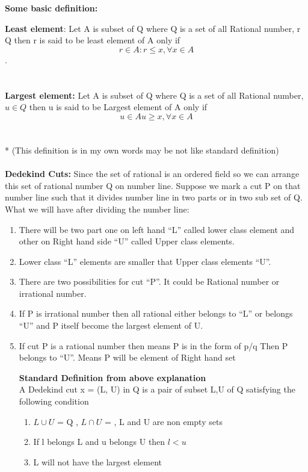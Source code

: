 \documentclass[15]{article}
\begin{document}
\textbf{Some basic definition:}

\textbf{Least element}:  Let A is subset of Q where Q is a set of all Rational number, r  Q then r is said to be least element of A only if
$$r {\in} A:r {\leq x} ,{\forall} x {\in} A$$. \\   
\\
\\
\textbf{Largest element:}  Let A is subset of Q where Q is a set of all Rational number, $ u {\in} Q $ then u is said to be Largest element of A only if
$$u {\in} A
u {\geq} x, \forall x \in A $$
\\
\\*
(This definition is in my own words may be not like standard definition)\\
\\
\textbf{Dedekind Cuts:}  Since the set of rational is an ordered field so  we can arrange this set of rational number Q on number line. Suppose we mark a cut P on that number line such that it divides number line in two parts or in two sub set of Q.
\\
What we will have after dividing the number line:
\begin{enumerate}
\item There will be two part one on left hand “L” called lower class element and other on Right hand side “U” called Upper class elements.

\item Lower class “L” elements are smaller that Upper class elements “U”.

\item There are two possibilities for cut “P”. It could be Rational number or irrational number.

\item If P is irrational number then all rational either belongs to “L” or belongs “U” and P itself become the largest element of U.

\item If cut P is a rational number then means P is in the form of p/q
Then P belongs to “U”. Means P will be element of Right hand set
\pagebreak

\textbf{Standard Definition from above explanation}
\\
A Dedekind cut x = (L, U) in Q is a pair of subset L,U of Q satisfying the following condition
\begin{enumerate}
\item $L \cup U$ = Q ,  $L \cap U$ = {}, L and U are non empty sets
\item If l belongs L and u belongs U then $l<u$
\item L will not have the largest element 


\end{enumerate}




\end{enumerate}
\end{document}

